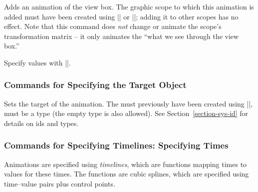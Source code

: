\begin{command}{\pgfsys@animateviewbox}
  Adds an animation of the view box. The graphic scope to which this
  animation is added must have been created using
  |\pgfsys@viewboxmeet| or |\pgfsys@viewboxslice|; adding it to other
  scopes has no effect. Note that this command does \emph{not}
  change or animate the scope's transformation matrix -- it only animates the
  ``what we see through the view box.''
  
  Specify values with |\pgfsys@animation@val@viewbox|.
\begin{codeexample}[width=5cm]
\end{codeexample}
\end{command}


\subsubsection{Commands for Specifying the Target Object}

\begin{command}{\pgfsys@animation@whom{}}
  Sets the target of the animation. The  must previously have
  been created using |\pgfsys@new@id|,  must be a type (the
  empty type is also allowed). See Section~\ref{section-sys-id} for
  details on ids and types.
\end{command}




\subsubsection{Commands for Specifying Timelines: Specifying Times}

Animations are specified using \emph{timelines}, which are functions
mapping times to values for these times. The functions are cubic
splines, which are specified using time--value pairs plus control
points.

